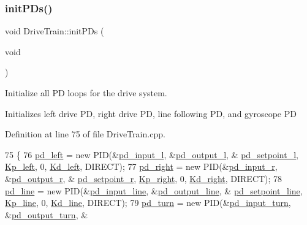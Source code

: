 \subsubsection{\texorpdfstring{init\+P\+Ds()}{initPDs()}}
{\footnotesize\ttfamily void Drive\+Train\+::init\+P\+Ds (\begin{DoxyParamCaption}\item[{void}]{ }\end{DoxyParamCaption})}



Initialize all PD loops for the drive system. 

Initializes left drive PD, right drive PD, line following PD, and gyroscope PD 

Definition at line 75 of file Drive\+Train.\+cpp.


\begin{DoxyCode}
75                              \{
76     \hyperlink{class_drive_train_a89603458433a6b9beffc91e6fa73f32d}{pd\_left} = \textcolor{keyword}{new} PID(&\hyperlink{class_drive_train_a5fbf7b883990fe8bf69f6a81c317438f}{pd\_input\_l}, &\hyperlink{class_drive_train_a53268d36c28c3ed0e70aaf69086d4953}{pd\_output\_l}, &
      \hyperlink{class_drive_train_a44be549ca050bf41e9b2474a2640200b}{pd\_setpoint\_l}, \hyperlink{class_drive_train_a6e48dfe233b2b5fb280032d4a68893c6}{Kp\_left}, 0, \hyperlink{class_drive_train_a1126ee729fbc3418eaa7663013650770}{Kd\_left}, DIRECT);
77     \hyperlink{class_drive_train_ab132e86e29dbc4e7d5613786658719f0}{pd\_right} = \textcolor{keyword}{new} PID(&\hyperlink{class_drive_train_a663ad534480bcd9ca2010a23dc506997}{pd\_input\_r}, &\hyperlink{class_drive_train_a4c3242a549d04b72192e5cf9e590845e}{pd\_output\_r}, &
      \hyperlink{class_drive_train_a57e389649151326bf84ab4bd13b6b61c}{pd\_setpoint\_r}, \hyperlink{class_drive_train_a58317604093fb4fd0a29cce1d7a6c1b4}{Kp\_right}, 0, \hyperlink{class_drive_train_a81fc87add62f4d2baa8627bf20949c75}{Kd\_right}, DIRECT);
78     \hyperlink{class_drive_train_ae33321a75190a321ce50d884ae6e2393}{pd\_line} = \textcolor{keyword}{new} PID(&\hyperlink{class_drive_train_a90fc51b379f9660ecef4f5a00275e63c}{pd\_input\_line}, &\hyperlink{class_drive_train_a02595614747de0602048d8d5e9643750}{pd\_output\_line}, &
      \hyperlink{class_drive_train_ad7872c04206945d3a2e04dcd167ea6a8}{pd\_setpoint\_line}, \hyperlink{class_drive_train_a6edead09e2ecef2ce23bf6b45bcceebb}{Kp\_line}, 0, \hyperlink{class_drive_train_a7c21032f1cbaafbd53fc035d7e67ccdf}{Kd\_line}, DIRECT);
79     \hyperlink{class_drive_train_a709deffb7683fd3efe0f340580a8e5e0}{pd\_turn} = \textcolor{keyword}{new} PID(&\hyperlink{class_drive_train_ad7822ae718d02c94e1baed9b3c13bb67}{pd\_input\_turn}, &\hyperlink{class_drive_train_a65aa0053b0648cf1fea8d0f0fc21c04e}{pd\_output\_turn}, &

\end{DoxyCode}
